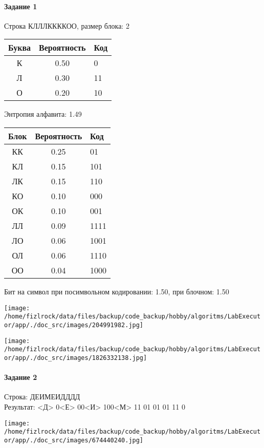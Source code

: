 \documentclass[a4paper, 12pt]{article}
\begin{document}
\paragraph{Задание 1}

Строка КЛЛЛККККОО, размер блока: 2
\begin{center}
 \begin{tabular}{ |c|c|l| } 
  \hline
     Буква & Вероятность & Код\\ \hline
К & 0.50 & 0\\\hline
Л & 0.30 & 11\\\hline
О & 0.20 & 10
\\ \hline \end{tabular}
\end{center}
Энтропия алфавита: 1.49
\begin{center}
 \begin{tabular}{ |c|c|l| } 
  \hline
     Блок & Вероятность & Код\\ \hline
КК & 0.25 & 01\\\hline
КЛ & 0.15 & 101\\\hline
ЛК & 0.15 & 110\\\hline
КО & 0.10 & 000\\\hline
ОК & 0.10 & 001\\\hline
ЛЛ & 0.09 & 1111\\\hline
ЛО & 0.06 & 1001\\\hline
ОЛ & 0.06 & 1110\\\hline
ОО & 0.04 & 1000
\\ \hline \end{tabular}
\end{center}
Бит на символ при посимвольном кодировании: 1.50, при блочном: 1.50

\texttt{[image: /home/fizlrock/data/files/backup/code\_backup/hobby/algoritms/LabExecutor/app/./doc\_src/images/204991982.jpg]}

\texttt{[image: /home/fizlrock/data/files/backup/code\_backup/hobby/algoritms/LabExecutor/app/./doc\_src/images/1826332138.jpg]}
\pagebreak
\paragraph{Задание 2}

Строка: 
ДЕИМЕИДДДД\\
Результат: <Д> 0<Е> 00<И> 100<М> 11 01 01 01 11 0

\texttt{[image: /home/fizlrock/data/files/backup/code\_backup/hobby/algoritms/LabExecutor/app/./doc\_src/images/674440240.jpg]}
\end{document}
